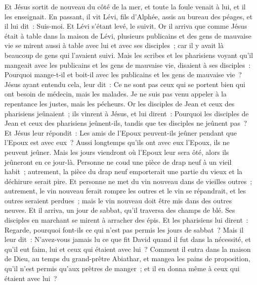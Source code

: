 \begin{multicols}{2}
Et Jésus sortit de nouveau du côté de la mer, et toute la foule venait à lui, et il les enseignait.
En passant, il vit Lévi, fils d'Alphée, assis au bureau des péages, et il lui dit~: Suis-moi. Et Lévi s'étant levé, le suivit.
Or il arriva que comme Jésus était à table dans la maison de Lévi, plusieurs publicains et des gens de mauvaise vie se mirent aussi à table avec lui et avec ses disciples~; car il y avait là beaucoup de gens qui l'avaient suivi.
Mais les scribes et les pharisiens voyant qu'il mangeait avec les publicains et les gens de mauvaise vie, disaient à ses disciples~: Pourquoi mange-t-il et boit-il avec les publicains et les gens de mauvaise vie~?
Jésus ayant entendu cela, leur dit~: Ce ne sont pas ceux qui se portent bien qui ont besoin de médecin, mais les malades. Je ne suis pas venu appeler à la repentance les justes, mais les pécheurs.
Or les disciples de Jean et ceux des pharisiens jeûnaient~; ils vinrent à Jésus, et lui dirent~: Pourquoi les disciples de Jean et ceux des pharisiens jeûnent-ils, tandis que tes disciples ne jeûnent pas~?
Et Jésus leur répondit~: Les amis de l'Epoux peuvent-ils jeûner pendant que l'Epoux est avec eux~? Aussi longtemps qu'ils ont avec eux l'Epoux, ils ne peuvent jeûner.
Mais les jours viendront où l'Epoux leur sera ôté, alors ils jeûneront en ce jour-là.
Personne ne coud une pièce de drap neuf à un vieil habit~; autrement, la pièce du drap neuf emporterait une partie du vieux et la déchirure serait pire.
Et personne ne met du vin nouveau dans de vieilles outres~; autrement, le vin nouveau ferait rompre les outres et le vin se répandrait, et les outres seraient perdues~; mais le vin nouveau doit être mis dans des outres neuves.
Et il arriva, un jour de sabbat, qu'il traversa des champs de blé. Ses disciples en marchant se mirent à arracher des épis.
Et les pharisiens lui dirent~: Regarde, pourquoi font-ils ce qui n'est pas permis les jours de sabbat~?
Mais il leur dit~: N'avez-vous jamais lu ce que fit David quand il fut dans la nécessité, et qu'il eut faim, lui et ceux qui étaient avec lui~?
Comment il entra dans la maison de Dieu, au temps du grand-prêtre Abiathar, et mangea les pains de proposition, qu'il n'est permis qu'aux prêtres de manger~; et il en donna même à ceux qui étaient avec lui~?

\end{multicols}
